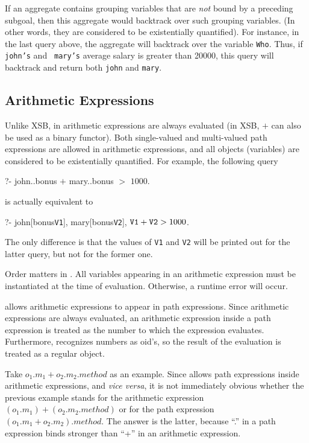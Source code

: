 \documentclass[11pt]{report}
\begin{document}
If an aggregate contains grouping variables that are \emph{not} bound by a
preceding subgoal, then this aggregate would backtrack over such grouping
variables. (In other words, they are considered to be existentially
quantified). For instance, in the last query above, the aggregate will
backtrack over the variable {\tt Who}. Thus, if {\tt john's} and {\tt
  mary's} average salary is greater than 20000, this query will backtrack
and return both {\tt john} and {\tt mary}.

\subsection{Arithmetic Expressions}

Unlike XSB, in \FLORA arithmetic expressions are always evaluated (in XSB,
$+$ can also be used as a binary functor). Both single-valued and
multi-valued path expressions are allowed in arithmetic expressions, and
all objects (variables) are considered to be existentially quantified. For
example, the following query
\begin{qrules}
?- john..bonus $+$ mary..bonus $>$ $1000$.
\end{qrules}
is actually equivalent to
\begin{qrules}
?- john[bonus{\mvd}{\tt V1}], mary[bonus{\mvd}{\tt V2}], ${\tt V1}+{\tt V2} > 1000$.
\end{qrules}
The only difference is that the values of {\tt V1} and {\tt V2} will be
printed out for the latter query, but not for the former one.

Order matters in \FLORA. All variables appearing in an arithmetic
expression must be instantiated at the time of evaluation. Otherwise, a
runtime error will occur.

\FLORA allows arithmetic expressions to appear in path expressions. Since
arithmetic expressions are always evaluated, an arithmetic expression
inside a path expression is treated as the number to which the
expression evaluates. Furthermore, \FLORA recognizes numbers as oid's, so
the result of the evaluation is treated as a regular object.

Take $o_1.m_1+o_2.m_2.method$ as an example. Since \FLORA allows path
expressions inside arithmetic expressions, and {\it vice versa}, it is not
immediately obvious whether the previous example stands for the arithmetic
expression $(o_1.m_1)+(o_2.m_2.method)$ or for the path expression
$(o_1.m_1+o_2.m_2).method$. The answer is the latter, because ``.'' in a
path expression binds stronger than ``+'' in an arithmetic expression.
\end{document}
